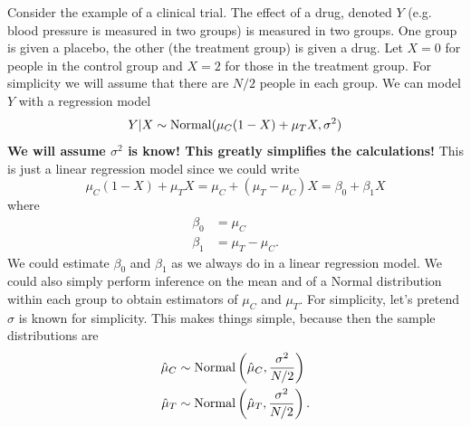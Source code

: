 \begin{example}
Consider the example of a clinical trial. The effect of a drug, denoted $Y$ (e.g. blood pressure is measured in two groups) is measured in two groups.  One group is given a placebo, the other (the treatment group) is given a drug. Let $X=0$ for people in the control group and $X=2$ for those in the treatment group.   For simplicity we will assume that there are $N/2$ people in each group. We can model $Y$ with a regression model 
\begin{equation*}
Y|X \sim{\rm Normal}(\mu_C (1-X) + \mu_T X,\sigma^2)
\end{equation*}
{\bf We will assume $\sigma^2$ is know! This greatly simplifies the calculations!}
This is just a linear regression model since we could write
\begin{equation*}
\mu_C (1-X) + \mu_T X = \mu_C + (\mu_T-\mu_C)X = \beta_0 + \beta_1 X
\end{equation*}
where
\begin{align*}
\beta_0 &= \mu_C\\
\beta_1 &= \mu_T - \mu_C.
\end{align*}
We could estimate $\beta_0$ and $\beta_1$ as we always do in a linear regression model. We could also simply perform inference on the mean and of a Normal distribution within each group to obtain estimators of $\mu_C$ and $\mu_T$. For simplicity, let's pretend $\sigma$ is known for simplicity. This makes things simple, because then the sample distributions are 
 \begin{align*}
 \hat{\mu}_C &\sim {\rm Normal}\left(\hat{\mu}_C,\frac{\sigma^2}{N/2}\right)\\
  \hat{\mu}_T &\sim {\rm Normal}\left(\hat{\mu}_T,\frac{\sigma^2}{N/2}\right). 
 \end{align*}
 

\end{example}
